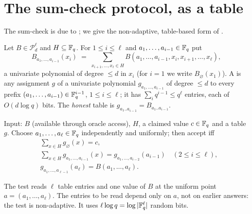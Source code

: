\section{The sum-check protocol, as a table}
\label{sec:sumcheck}

The sum-check is due to \citet{LFKN92}; we give the non-adaptive, table-based form of \citet{AroraSafra98}.

Let $B\in\mathcal P^{\ell}_d$ and $H\subseteq\mathbb{F}_q$.  For $1\le i\le\ell$ and $a_1,\dots,a_{i-1}\in\mathbb{F}_q$ put
\[
  B_{a_1,\dots,a_{i-1}}(x_i)\;=\;\sum_{x_{i+1},\dots,x_\ell\in H}B(a_1,\dots,a_{i-1},x_i,x_{i+1},\dots,x_\ell),
\]
a univariate polynomial of degree $\le d$ in $x_i$ (for $i=1$ we write $B_\varnothing(x_1)$).  A  is any assignment $g$ of a univariate polynomial
$g_{a_1,\dots,a_{i-1}}$ of degree $\le d$ to every prefix $(a_1,\dots,a_{i-1})\in\mathbb{F}_q^{i-1}$, $1\le i\le\ell$; it has $\sum_i q^{i-1}\le q^\ell$ entries, each of $O(d\log q)$ bits.
The \emph{honest} table is $g_{a_1..a_{i-1}}=B_{a_1..a_{i-1}}$.

\begin{definition}\label{def:sumcheck}
Input: $B$ (available through oracle access), $H$, a claimed value $c\in\mathbb{F}_q$ and a table $g$.
Choose $a_1,\dots,a_\ell\in\mathbb{F}_q$ independently and uniformly; then accept iff
\begin{align*}
  &\sum_{x\in H}g_\varnothing(x)=c,\\
  &\sum_{x\in H}g_{a_1,\dots,a_{i-1}}(x)=g_{a_1,\dots,a_{i-2}}(a_{i-1})\quad(2\le i\le\ell),\\
  &g_{a_1,\dots,a_{\ell-1}}(a_\ell)=B(a_1,\dots,a_\ell).
\end{align*}
\end{definition}

\noindent
The test reads $\ell$ table entries and one value of $B$ at the uniform point $a=(a_1,\dots,a_\ell)$.  The entries to be read depend only on $a$, not on
earlier answers: the test is non-adaptive.  It uses $\ell\log q=\log|\mathbb{F}_q^\ell|$ random bits.

